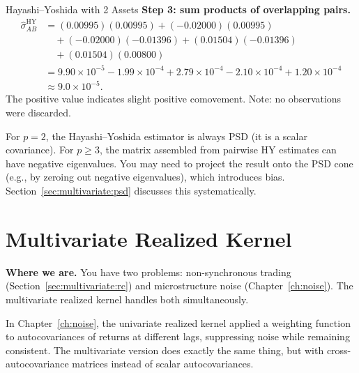 \begin{workedexample}{Hayashi--Yoshida with 2 Assets}
\textbf{Step 3: sum products of overlapping pairs.}
\begin{align*}
  \widehat{\sigma}_{AB}^{\mathrm{HY}}
  &= (0.00995)(0.00995) + (-0.02000)(0.00995) \\
  &\quad + (-0.02000)(-0.01396) + (0.01504)(-0.01396) \\
  &\quad + (0.01504)(0.00800) \\
  &= 9.90 \times 10^{-5} - 1.99 \times 10^{-4} + 2.79 \times 10^{-4}
     - 2.10 \times 10^{-4} + 1.20 \times 10^{-4} \\
  &\approx 9.0 \times 10^{-5}.
\end{align*}
The positive value indicates slight positive comovement. Note: no observations
were discarded.
\end{workedexample}

\begin{warning}
For $p = 2$, the Hayashi--Yoshida estimator is always PSD (it is a scalar
covariance). For $p \geq 3$, the matrix assembled from pairwise HY estimates
can have negative eigenvalues. You may need to project the result onto the
PSD cone (e.g., by zeroing out negative eigenvalues), which introduces bias.
Section~\ref{sec:multivariate:psd} discusses this systematically.
\end{warning}


\section{Multivariate Realized Kernel}\label{sec:multivariate:mrk}

\textbf{Where we are.}  You have two problems: non-synchronous trading
(Section~\ref{sec:multivariate:rc}) and microstructure noise
(Chapter~\ref{ch:noise}). The multivariate realized kernel handles both
simultaneously.

\begin{intuition}
In Chapter~\ref{ch:noise}, the univariate realized kernel applied a weighting
function to autocovariances of returns at different lags, suppressing noise
while remaining consistent. The multivariate version does exactly the same
thing, but with cross-autocovariance matrices instead of scalar autocovariances.
\end{intuition}

